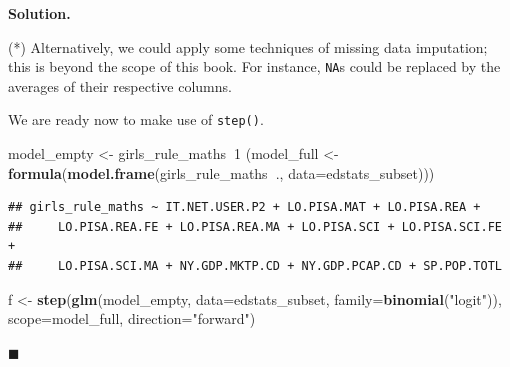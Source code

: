 \documentclass[10pt,b5paper,krantz1]{krantz}
\newenvironment{Shaded}{\begin{snugshade}}{\end{snugshade}}
\newcommand{\DataTypeTok}[1]{\textcolor[rgb]{0.27,0.27,0.27}{#1}}
\newcommand{\DecValTok}[1]{\textcolor[rgb]{0.06,0.06,0.06}{#1}}
\newcommand{\KeywordTok}[1]{\textcolor[rgb]{0.27,0.27,0.27}{\textbf{#1}}}
\newcommand{\NormalTok}[1]{#1}
\newcommand{\OperatorTok}[1]{\textcolor[rgb]{0.43,0.43,0.43}{\textbf{#1}}}
\newcommand{\StringTok}[1]{\textcolor[rgb]{0.5,0.5,0.5}{#1}}
\newenvironment{solution}{%
\bigskip\noindent\textbf{Solution. }%
\it\ignorespaces%
\ignorespaces%
}{\ignorespaces%
\hfill$\blacksquare$%
}
\begin{document}
\begin{solution}
(*) Alternatively, we could apply some techniques of missing data imputation;
this is beyond the scope of this book. For instance, \texttt{NA}s could be
replaced by the averages of their respective columns.

We are ready now to make use of \texttt{step()}.

\begin{Shaded}
\begin{Highlighting}[]
\NormalTok{model_empty <-}\StringTok{ }\NormalTok{girls_rule_maths}\OperatorTok{~}\DecValTok{1}
\NormalTok{(model_full <-}\StringTok{ }\KeywordTok{formula}\NormalTok{(}\KeywordTok{model.frame}\NormalTok{(girls_rule_maths}\OperatorTok{~}\NormalTok{.,}
    \DataTypeTok{data=}\NormalTok{edstats_subset)))}
\end{Highlighting}
\end{Shaded}

\begin{verbatim}
## girls_rule_maths ~ IT.NET.USER.P2 + LO.PISA.MAT + LO.PISA.REA + 
##     LO.PISA.REA.FE + LO.PISA.REA.MA + LO.PISA.SCI + LO.PISA.SCI.FE + 
##     LO.PISA.SCI.MA + NY.GDP.MKTP.CD + NY.GDP.PCAP.CD + SP.POP.TOTL
\end{verbatim}

\begin{Shaded}
\begin{Highlighting}[]
\NormalTok{f <-}\StringTok{ }\KeywordTok{step}\NormalTok{(}\KeywordTok{glm}\NormalTok{(model_empty, }\DataTypeTok{data=}\NormalTok{edstats_subset, }\DataTypeTok{family=}\KeywordTok{binomial}\NormalTok{(}\StringTok{"logit"}\NormalTok{)),}
    \DataTypeTok{scope=}\NormalTok{model_full, }\DataTypeTok{direction=}\StringTok{"forward"}\NormalTok{)}
\end{Highlighting}
\end{Shaded}


\end{solution}
\end{document}
